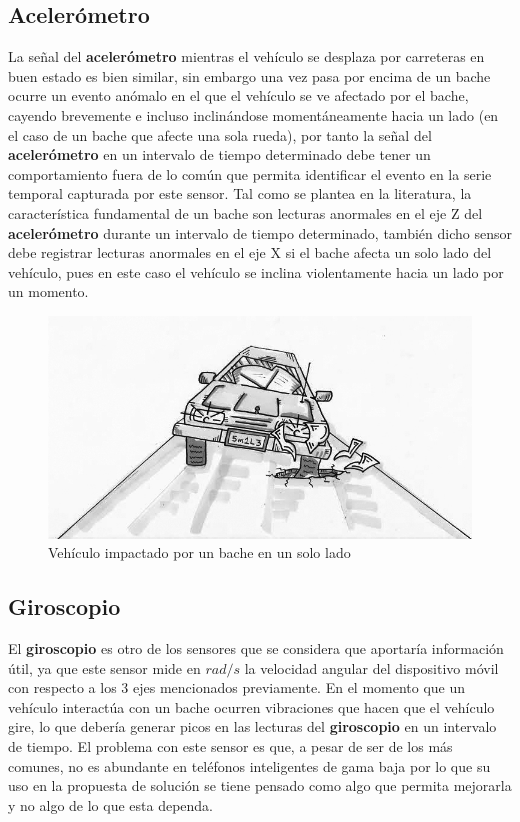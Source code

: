 	\subsection{Acelerómetro}
		La señal del \textbf{acelerómetro} mientras el vehículo se desplaza por carreteras en buen estado es bien similar,
		sin embargo una vez pasa por encima de un bache ocurre un evento anómalo en el que el vehículo se ve afectado
		por el bache, cayendo brevemente e incluso inclinándose momentáneamente hacia un lado (en el caso de un bache
		que afecte una sola rueda), por tanto la señal del \textbf{acelerómetro} en un intervalo de tiempo determinado debe tener
		un comportamiento fuera de lo común que permita identificar el evento en la serie temporal capturada por este sensor.
		Tal como se plantea en la literatura, la característica fundamental de un bache son lecturas anormales en el eje
		Z del \textbf{acelerómetro} durante un intervalo de tiempo determinado, también dicho sensor debe registrar lecturas
		anormales en el eje X si el bache afecta un solo lado del vehículo, pues en este caso el vehículo se inclina violentamente
		hacia un lado por un momento.\\

	\begin{figure}[htb]
		\centering
		\includegraphics[scale = 0.5]{Graphics/one_side_pothole_vehicle.jpg}
		\caption{Vehículo impactado por un bache en un solo lado}
		\label{fig:2}
	\end{figure}

	\subsection{Giroscopio}
		El \textbf{giroscopio} es otro de los sensores que se considera que aportaría información útil, ya que este sensor 
		mide en $rad/s$ la velocidad angular del dispositivo móvil con respecto a los 3 ejes mencionados previamente. 
		En el momento que un vehículo interactúa con un bache ocurren vibraciones que hacen que el vehículo gire, lo que
		debería generar picos en las lecturas del \textbf{giroscopio} en un intervalo de tiempo. El problema con este sensor es 
		que, a pesar de ser de los más comunes, no es abundante en teléfonos inteligentes de gama baja por lo que 
		su uso en la propuesta de solución se tiene pensado como algo que permita mejorarla y no algo de lo que esta
		dependa.\\


